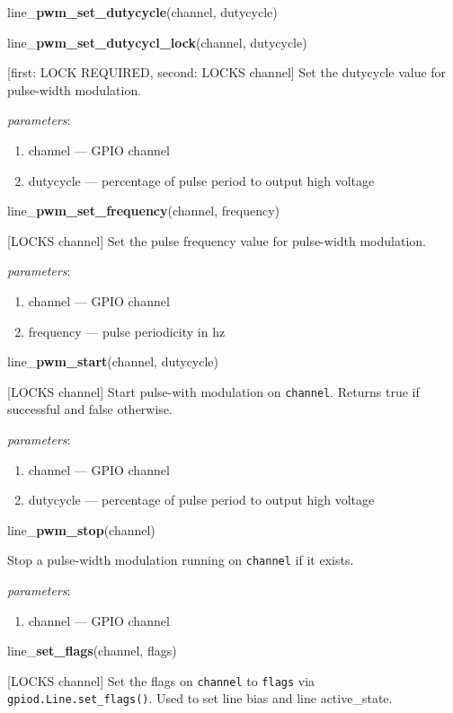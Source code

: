 \documentclass[12pt]{article}
\begin{document}
\noindent line\_\textbf{pwm\_set\_dutycycle}(channel, dutycycle)

\noindent line\_\textbf{pwm\_set\_dutycycl\_lock}(channel, dutycycle)

[first: LOCK REQUIRED, second: LOCKS channel]
Set the dutycycle value for pulse-width modulation.

\textit{parameters}:
\begin{enumerate}      
        \item channel --- GPIO channel
        \item dutycycle --- percentage of pulse period to output high voltage
\end{enumerate}

\noindent line\_\textbf{pwm\_set\_frequency}(channel, frequency)

[LOCKS channel] Set the pulse frequency value for pulse-width modulation.

\textit{parameters}:
\begin{enumerate}      
        \item channel --- GPIO channel
        \item frequency --- pulse periodicity in hz
\end{enumerate}

\noindent line\_\textbf{pwm\_start}(channel, dutycycle)

[LOCKS channel] Start pulse-with modulation on \texttt{channel}.
Returns true if successful and false otherwise.

\textit{parameters}:
\begin{enumerate}      
        \item channel --- GPIO channel
        \item dutycycle --- percentage of pulse period to output high voltage
\end{enumerate}

\noindent line\_\textbf{pwm\_stop}(channel)

Stop a pulse-width modulation running on \texttt{channel} if it exists.

\textit{parameters}:
\begin{enumerate}      
        \item channel --- GPIO channel
\end{enumerate}

\noindent line\_\textbf{set\_flags}(channel, flags)

[LOCKS channel]
Set the flags on \texttt{channel} to \texttt{flags} via \texttt{gpiod.Line.set\_flags()}. Used to set line bias and line active\_state.
\end{document}
